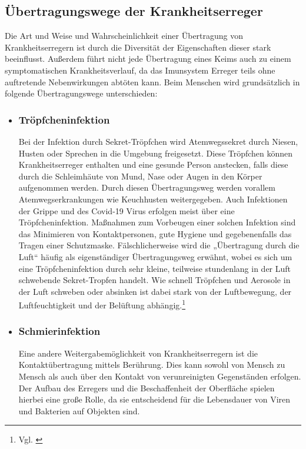 \documentclass[12pt]{article}
\begin{document}
\subsection{Übertragungswege der Krankheitserreger}
Die Art und Weise und Wahrscheinlichkeit einer Übertragung von Krankheitserregern ist durch die Diversität der Eigenschaften dieser stark beeinflusst. Außerdem führt nicht jede Übertragung eines Keims auch zu einem symptomatischen Krankheitsverlauf, da das Imunsystem Erreger teils ohne auftretende Nebenwirkungen abtöten kann. Beim Menschen wird grundsätzlich in folgende Übertragungswege unterschieden:
\begin{itemize}
    \item \subsubsection{Tröpfcheninfektion}
    Bei der Infektion durch Sekret-Tröpfchen wird Atemwegssekret durch Niesen, Husten oder Sprechen in die Umgebung freigesetzt. Diese Tröpfchen können Krankheitserreger enthalten und eine gesunde Person anstecken, falls diese durch die Schleimhäute von Mund, Nase oder Augen in den Körper aufgenommen werden. Durch diesen Übertragungsweg werden vorallem Atemwegserkrankungen wie Keuchhusten weitergegeben. Auch Infektionen der Grippe und des Covid-19 Virus erfolgen meist über eine Tröpfcheninfektion. Maßnahmen zum Vorbeugen einer solchen Infektion sind das Minimieren von Kontaktpersonen, gute Hygiene und gegebenenfalls das Tragen einer Schutzmaske.
    Fälschlicherweise wird die „Übertragung durch die Luft“ häufig als eigenständiger Übertragungsweg erwähnt, wobei es sich um eine Tröpfcheninfektion durch sehr kleine, teilweise stundenlang in der Luft schwebende Sekret-Tropfen handelt. Wie schnell Tröpfchen und Aerosole in der Luft schweben oder absinken ist dabei stark von der Luftbewegung, der Luftfeuchtigkeit und der Belüftung abhängig.\footnote{Vgl. \cite{Rki21}}
    \item \subsubsection{Schmierinfektion}
    Eine andere Weitergabemöglichkeit von Krankheitserregern ist die Kontaktübertragung mittels Berührung. Dies kann sowohl von Mensch zu Mensch als auch über den Kontakt von verunreinigten Gegenständen erfolgen. Der Aufbau des Erregers und die Beschaffenheit der Oberfläche spielen hierbei eine große Rolle, da sie entscheidend für die Lebensdauer von Viren und Bakterien auf Objekten sind.

\end{itemize}
\end{document}
